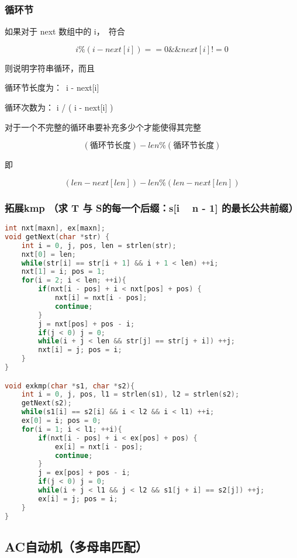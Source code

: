 \subsubsection{循环节}

如果对于 next 数组中的 i， 符合 

$$i\%( i - next[i] ) == 0 \&\& next[i] != 0$$

则说明字符串循环，而且

循环节长度为： i - next[i]

循环次数为： i / ( i - next[i] )

对于一个不完整的循环串要补充多少个才能使得其完整

$$(循环节长度) - len\%(循环节长度)$$

即

$$(len - next[len]) - len\%(len - next[len])$$

\subsubsection{拓展kmp （求 T 与 {S的每一个后缀：s[i ~ n - 1]} 的最长公共前缀）}

\begin{lstlisting}[language=C++]
int nxt[maxn], ex[maxn];
void getNext(char *str) {
    int i = 0, j, pos, len = strlen(str);
    nxt[0] = len;
    while(str[i] == str[i + 1] && i + 1 < len) ++i;
    nxt[1] = i; pos = 1;
    for(i = 2; i < len; ++i){
        if(nxt[i - pos] + i < nxt[pos] + pos) {
            nxt[i] = nxt[i - pos];
            continue;
        }
        j = nxt[pos] + pos - i;
        if(j < 0) j = 0;
        while(i + j < len && str[j] == str[j + i]) ++j;
        nxt[i] = j; pos = i;
    }
}

void exkmp(char *s1, char *s2){
    int i = 0, j, pos, l1 = strlen(s1), l2 = strlen(s2);
    getNext(s2);
    while(s1[i] == s2[i] && i < l2 && i < l1) ++i;
    ex[0] = i; pos = 0;
    for(i = 1; i < l1; ++i){
        if(nxt[i - pos] + i < ex[pos] + pos) {
            ex[i] = nxt[i - pos];
            continue;
        }
        j = ex[pos] + pos - i;
        if(j < 0) j = 0;
        while(i + j < l1 && j < l2 && s1[j + i] == s2[j]) ++j;
        ex[i] = j; pos = i;
    }
}
\end{lstlisting}

\subsection{AC自动机（多母串匹配）}

